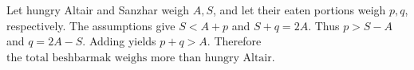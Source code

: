 Let hungry Altair and Sanzhar weigh $A,S$, and let their eaten portions weigh $p,q$, respectively. The assumptions give $S<A+p$ and $S+q=2A$. Thus $p>S-A$ and $q=2A-S$. Adding yields $p+q>A$. Therefore $\boxed{\text{the total beshbarmak weighs more than hungry Altair}}$.

